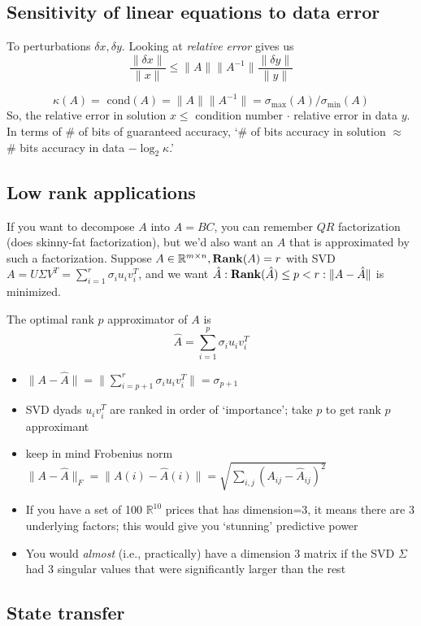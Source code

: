 \documentclass[10pt,letterpaper]{article}
\begin{document}
\subsection{Sensitivity of linear equations to data error}
\label{sec-17_1}

To perturbations $\delta x,\delta y$. Looking at \emph{relative error} gives us
$$
\frac{\|\delta x\|}{\|x\|} \le \|A\| \|A ^{-1} \| \frac{\| \delta y \|}{\|y\|} 
$$

$$
\kappa(A) = \text{ cond}(A) = \|A \| \|A ^{-1} \| = \sigma _{\max} (A) /\sigma _{\min} (A)
$$
So, the relative error in solution $x \le$ condition number $\cdot$ relative error in data $y$. In terms of \# of bits of guaranteed accuracy, `\# of bits accuracy in solution $\approx$ \# bits accuracy in data $-\log _{2} \kappa$.'
\subsection{Low rank applications}
\label{sec-17_2}

If you want to decompose $A$ into $A=BC$, you can remember $QR$ factorization (does skinny-fat factorization), but we'd also want an $A$ that is approximated by such a factorization. Suppose $A \in \mathbb{R}^{m\times n}, {\bf Rank} (A)= r$ with SVD $A=U\Sigma V ^{T} = \sum _{i=1} ^{r} \sigma _{i} u _{i} v _{i} ^{T}$, and we want $\hat A: {\bf Rank} (\hat A) \le p<r: \|A-\hat A\|$ is minimized.

The optimal rank $p$ approximator of $A$ is
$$
\hat A=\sum ^{p} _{i=1} \sigma _{i} u _{i} v _{i} ^{T} 
$$
\begin{itemize}
\item $\|A-\hat A\|= \| \sum ^{r} _{i=p+1} \sigma _{i} u _{i} v _{i} ^{T} \| = \sigma _{p+1}$
\item SVD dyads $u _{i} v _{i} ^{T}$ are ranked in order of `importance'; take $p$ to get rank $p$ approximant
\item keep in mind Frobenius norm $\|A-\hat A\| _{F} = \| A(i)- \hat A(i)\| = \sqrt{\sum _{i,j} (A _{ij} - \hat A _{ij} ) ^{2} }$
\item If you have a set of 100 $\mathbb{R}^{10}$ prices that has dimension=3, it means there are 3 underlying factors; this would give you `stunning' predictive power
\item You would \emph{almost} (i.e., practically) have a dimension 3 matrix if the SVD $\Sigma$ had 3 singular values that were significantly larger than the rest
\end{itemize}
\subsection{State transfer}
\label{sec-17_3}
\end{document}
